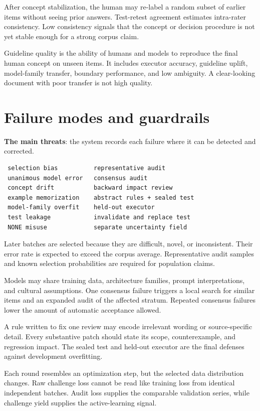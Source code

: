 After concept stabilization, the human may re-label a random subset of earlier items without seeing prior answers. Test-retest agreement estimates intra-rater consistency. Low consistency signals that the concept or decision procedure is not yet stable enough for a strong corpus claim.

Guideline quality is the ability of humans and models to reproduce the final human concept on unseen items. It includes executor accuracy, guideline uplift, model-family transfer, boundary performance, and low ambiguity. A clear-looking document with poor transfer is not high quality.


\section{Failure modes and guardrails}
\textbf{The main threats}: the system records each failure where it can be detected and corrected.

\begin{verbatim}
 selection bias          representative audit
 unanimous model error   consensus audit
 concept drift           backward impact review
 example memorization    abstract rules + sealed test
 model-family overfit    held-out executor
 test leakage            invalidate and replace test
 NONE misuse             separate uncertainty field
\end{verbatim}
Later batches are selected because they are difficult, novel, or inconsistent. Their error rate is expected to exceed the corpus average. Representative audit samples and known selection probabilities are required for population claims.

Models may share training data, architecture families, prompt interpretations, and cultural assumptions. One consensus failure triggers a local search for similar items and an expanded audit of the affected stratum. Repeated consensus failures lower the amount of automatic acceptance allowed.

A rule written to fix one review may encode irrelevant wording or source-specific detail. Every substantive patch should state its scope, counterexample, and regression impact. The sealed test and held-out executor are the final defenses against development overfitting.

Each round resembles an optimization step, but the selected data distribution changes. Raw challenge loss cannot be read like training loss from identical independent batches. Audit loss supplies the comparable validation series, while challenge yield supplies the active-learning signal.


